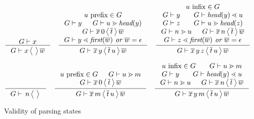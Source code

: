 \documentclass{article}
\begin{document}
\begin{figure}
  \[
  \inference{\stree{G}{x}}{\sstate{G}{x}{}{\seq{w}}}
  \quad
  \inference{
    \hasfix{u}{\prefix{}{}}{G} \\
    \stree{G}{y} & \sgd{G}{u}{\head{y}} \\
    \sqstate{G}{\seq{x}}{0}{\seq{t}}{\seq{w}} \\
  \sld{G}{y}{\textit{first}(\seq{w})} \textit{ or } \seq{w}=\epsilon}
    {\sstate{G}{\seq{x}\,y}{\seq{t}\,u}{\seq{w}}}
  \quad
  \inference{
    \hasfix{u}{\infix{}{}}{G} \\
    \stree{G}{y} & \sld{G}{\head{y}}{u} \\
    \stree{G}{z} & \sgd{G}{u}{\head{z}} \\
    \sgd{G}{n}{u} & \sqstate{G}{\seq{x}}{n}{\seq{t}}{\seq{w}} \\
    \sld{G}{z}{\textit{first}(\seq{w})} \textit{ or } \seq{w}=\epsilon}
    {\sstate{G}{\seq{x}\,y\,z}{\seq{t}\,u}{\seq{w}}}
  \]
  
  \[
  \inference{}{\sqstate{G}{}{n}{}{}}
  \quad
  \inference{
    \hasfix{u}{\prefix{}{}}{G} & \sgd{G}{u}{m} \\
    \sqstate{G}{\seq{x}}{0}{\seq{t}}{\seq{w}}}
    {\sqstate{G}{\seq{x}}{m}{\seq{t}\,u}{\seq{w}}}
  \quad
  \inference{
    \hasfix{u}{\infix{}{}}{G} & \sgd{G}{u}{m} \\
    \stree{G}{y} & \sld{G}{\head{y}}{u} \\
    \sgd{G}{n}{u} & \sqstate{G}{\seq{x}}{n}{\seq{t}}{\seq{w}}}
    {\sqstate{G}{\seq{x}\,y}{m}{\seq{t}\,u}{\seq{w}}}
  \]

\caption{Validity of parsing states}
\end{figure}
\end{document}
